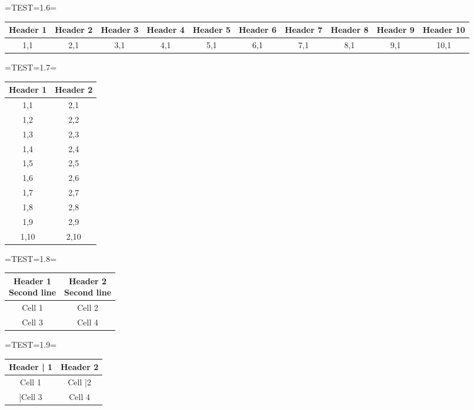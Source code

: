 \documentclass[a4paper]{article}
\begin{document}
=TEST=1.6=

\begin{table}[H]
\centering
\begin{tabular}{|cccccccccc|}
	\hline
	Header 1 & Header 2 & Header 3 & Header 4 & Header 5 & Header 6 & Header 7 & Header 8 & Header 9 & Header 10 \\
	\hline
	1,1 & 2,1 & 3,1 & 4,1 & 5,1 & 6,1 & 7,1 & 8,1 & 9,1 & 10,1 \\
	\hline
\end{tabular}
\end{table}

=TEST=1.7=

\begin{table}[H]
\centering
\begin{tabular}{|cc|}
	\hline
	Header 1 & Header 2 \\
	\hline
	1,1 & 2,1 \\
	1,2 & 2,2 \\
	1,3 & 2,3 \\
	1,4 & 2,4 \\
	1,5 & 2,5 \\
	1,6 & 2,6 \\
	1,7 & 2,7 \\
	1,8 & 2,8 \\
	1,9 & 2,9 \\
	1,10 & 2,10 \\
	\hline
\end{tabular}
\end{table}

=TEST=1.8=

\begin{table}[H]
\centering
\begin{tabular}{|cc|}
	\hline
	\shortstack{Header 1\\Second line} & \shortstack{Header 2\\Second line} \\
	\hline
	Cell 1 & Cell 2 \\
	Cell 3 & Cell 4 \\
	\hline
\end{tabular}
\end{table}

=TEST=1.9=

\begin{table}[H]
\centering
\begin{tabular}{|cc|}
	\hline
	Header | 1 & Header 2 \\
	\hline
	Cell 1 & Cell |2 \\
	|Cell 3 & Cell 4 \\
	\hline
\end{tabular}
\end{table}
\end{document}
